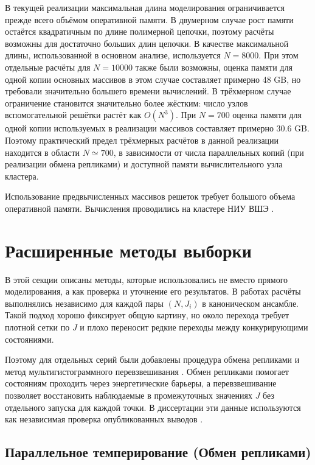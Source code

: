 В текущей реализации максимальная длина моделирования ограничивается прежде всего объёмом оперативной памяти. 
В двумерном случае рост памяти остаётся квадратичным по длине полимерной цепочки, поэтому расчёты возможны для достаточно больших длин цепочки. 
В качестве максимальной длины, использованной в основном анализе, используется $N=8000$. 
При этом отдельные расчёты для $N=10000$ также были возможны, оценка памяти для одной копии основных массивов в этом случае составляет примерно 48 GB, но  требовали  значительно большего времени вычислений.
В трёхмерном случае ограничение становится значительно более жёстким: число узлов вспомогательной решётки растёт как $O(N^3)$.  
При $N=700$ оценка памяти для одной копии используемых в реализации массивов составляет примерно  30.6 GB.  
Поэтому практический предел трёхмерных расчётов в данной реализации находится в области $N\simeq700$, в зависимости от числа параллельных копий (при реализации обмена репликами) и доступной памяти  вычислительного узла кластера.

Использование предвычисленных массивов решеток требует большого объема оперативной памяти. Вычисления проводились на кластере НИУ ВШЭ \cite{cHARISMa2021}. 

\section{Расширенные методы выборки}
\label{MCMC_effect}

В этой секции описаны методы, которые использовались не вместо прямого моделирования, а как проверка и уточнение его результатов. 
В работах \cite{faizullina2021critical1,rp7y-13mp} расчёты выполнялись независимо для каждой пары $(N,J_i)$ в каноническом ансамбле. 
Такой подход хорошо фиксирует общую картину, но около перехода требует плотной сетки по $J$ и плохо переносит редкие переходы между конкурирующими состояниями.

Поэтому для отдельных серий были добавлены процедура обмена репликами \cite{PhysRevLett.57.2607} и метод мультигистограммного перевзвешивания \cite{PhysRevLett.63.1195}. 
Обмен репликами помогает состояниям проходить через энергетические барьеры, а перевзвешивание позволяет восстановить наблюдаемые в промежуточных значениях $J$ без отдельного запуска для каждой точки. 
В диссертации эти данные используются как независимая проверка опубликованных выводов \cite{faizullina2021critical1,rp7y-13mp}.


\subsection{Параллельное темперирование (Обмен репликами)}

